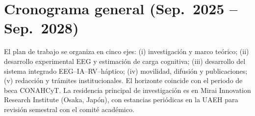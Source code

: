 \documentclass[12pt]{article}
\begin{document}

\section{Cronograma general (Sep.\ 2025 -- Sep.\ 2028)}

El plan de trabajo se organiza en cinco ejes: (i) investigación
y marco teórico; (ii) desarrollo experimental EEG y estimación de
carga cognitiva; (iii) desarrollo del sistema integrado
EEG--IA--RV--háptico; (iv) movilidad, difusión y publicaciones;
(v) redacción y trámites institucionales. El horizonte coincide
con el periodo de beca CONAHCyT. La residencia principal de
investigación es en Mirai Innovation Research Institute
(Osaka, Japón), con estancias periódicas en la UAEH para
revisión semestral con el comité académico.

\renewcommand{\arraystretch}{1.2}
\end{document}
